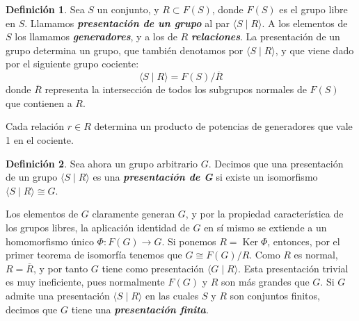 \documentclass[10pt]{report}
\DeclareMathOperator{\Ker}{Ker}
\newcommand{\enfatiza}[1]{\textbf{\textit{#1}}}
\theoremstyle{definition}
\newtheorem{defin}{Definición}[section]
\begin{document}
\begin{defin}
Sea $S$ un conjunto, y $R\subset F(S)$, donde $F(S)$ es el grupo libre en $S$. Llamamos \enfatiza{presentación de un grupo} al par $\langle S \mid R\rangle$. A los elementos de $S$ los llamamos \enfatiza{generadores}, y a los de $R$ \enfatiza{relaciones}. La presentación de un grupo determina un grupo, que también denotamos por $\langle S \mid R \rangle$, y que viene dado por el siguiente grupo cociente: 
\[
\langle S\mid R\rangle = F(S)/\overline{R}
\]
donde $\overline{R}$ representa la intersección de todos los subgrupos normales de $F(S)$ que contienen a $R$.
\end{defin}
Cada relación $r\in R$ determina un producto de potencias de generadores que vale 1 en el cociente.
\begin{defin}
Sea ahora un grupo arbitrario $G$. Decimos que una presentación de un grupo $\langle S \mid R \rangle$ es una \enfatiza{presentación de G} si existe un isomorfismo $\langle S \mid R\rangle \cong G$. 
\end{defin}
Los elementos de $G$ claramente generan $G$, y por la propiedad característica de los grupos libres, la aplicación identidad de $G$ en sí mismo se extiende a un homomorfismo único $\Phi: F(G) \to G$. Si ponemos $R= \Ker{\Phi}$, entonces, por el primer teorema de isomorfía tenemos que $G\cong F(G)/R$. Como $R$ es normal, $R=\overline{R}$, y por tanto $G$ tiene como presentación $\langle G\mid R\rangle$. Esta presentación trivial es muy ineficiente, pues normalmente $F(G)$ y $R$ son más grandes que $G$. 
Si $G$ admite una presentación $\langle S\mid R	\rangle$ en las cuales $S$ y $R$ son conjuntos finitos, decimos que $G$ tiene una \enfatiza{presentación finita}.
\end{document}
